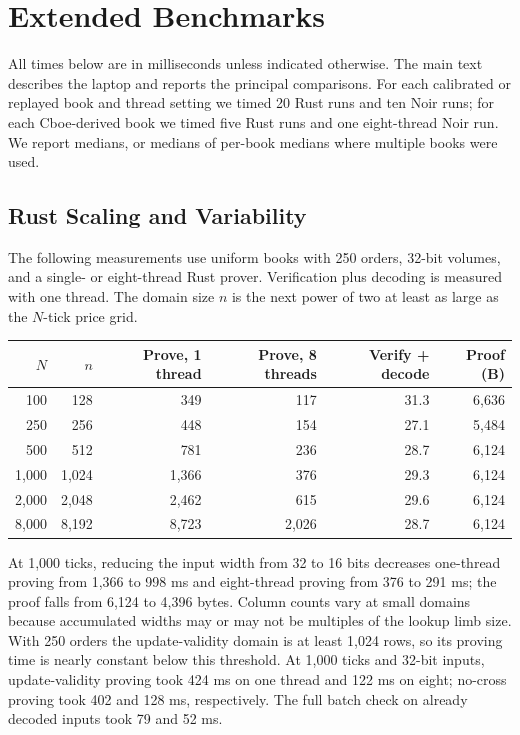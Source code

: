

\section{Extended Benchmarks}
\label{app:zq-bench}

All times below are in milliseconds unless indicated otherwise. The main text describes the laptop and reports the principal comparisons. For each calibrated or replayed book and thread setting we timed 20 Rust runs and ten Noir runs; for each Cboe-derived book we timed five Rust runs and one eight-thread Noir run. We report medians, or medians of per-book medians where multiple books were used.

\subsection{Rust Scaling and Variability}
\label{app:zq-bench-rust}

The following measurements use uniform books with 250 orders, 32-bit volumes, and a single- or eight-thread Rust prover. Verification plus decoding is measured with one thread. The domain size $n$ is the next power of two at least as large as the $N$-tick price grid.

\begin{center}
\small
\setlength{\tabcolsep}{4pt}
\begin{tabular}{@{}rrrrrr@{}}
\toprule
$N$ & $n$ & Prove, 1 thread & Prove, 8 threads & Verify + decode & Proof (B) \\
\midrule
100 & 128 & 349 & 117 & 31.3 & 6,636 \\
250 & 256 & 448 & 154 & 27.1 & 5,484 \\
500 & 512 & 781 & 236 & 28.7 & 6,124 \\
1,000 & 1,024 & 1,366 & 376 & 29.3 & 6,124 \\
2,000 & 2,048 & 2,462 & 615 & 29.6 & 6,124 \\
8,000 & 8,192 & 8,723 & 2,026 & 28.7 & 6,124 \\
\bottomrule
\end{tabular}
\end{center}

At 1,000 ticks, reducing the input width from 32 to 16 bits decreases one-thread proving from 1,366 to 998 ms and eight-thread proving from 376 to 291 ms; the proof falls from 6,124 to 4,396 bytes. Column counts vary at small domains because accumulated widths may or may not be multiples of the lookup limb size. With 250 orders the update-validity domain is at least 1,024 rows, so its proving time is nearly constant below this threshold. At 1,000 ticks and 32-bit inputs, update-validity proving took 424 ms on one thread and 122 ms on eight; no-cross proving took 402 and 128 ms, respectively. The full batch check on already decoded inputs took 79 and 52 ms.

